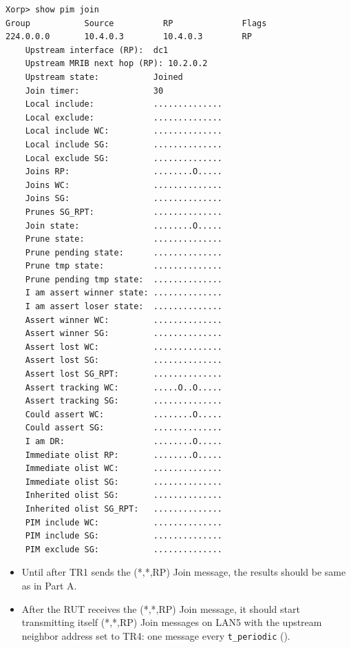 \documentclass[11pt]{report}
\begin{document}
\begin{itemize}
\begin{verbatim}
Xorp> show pim join 
Group           Source          RP              Flags
224.0.0.0       10.4.0.3        10.4.0.3        RP   
    Upstream interface (RP):  dc1
    Upstream MRIB next hop (RP): 10.2.0.2
    Upstream state:           Joined 
    Join timer:               30
    Local include:            ..............
    Local exclude:            ..............
    Local include WC:         ..............
    Local include SG:         ..............
    Local exclude SG:         ..............
    Joins RP:                 ........O.....
    Joins WC:                 ..............
    Joins SG:                 ..............
    Prunes SG_RPT:            ..............
    Join state:               ........O.....
    Prune state:              ..............
    Prune pending state:      ..............
    Prune tmp state:          ..............
    Prune pending tmp state:  ..............
    I am assert winner state: ..............
    I am assert loser state:  ..............
    Assert winner WC:         ..............
    Assert winner SG:         ..............
    Assert lost WC:           ..............
    Assert lost SG:           ..............
    Assert lost SG_RPT:       ..............
    Assert tracking WC:       .....O..O.....
    Assert tracking SG:       ..............
    Could assert WC:          ........O.....
    Could assert SG:          ..............
    I am DR:                  ........O.....
    Immediate olist RP:       ........O.....
    Immediate olist WC:       ..............
    Immediate olist SG:       ..............
    Inherited olist SG:       ..............
    Inherited olist SG_RPT:   ..............
    PIM include WC:           ..............
    PIM include SG:           ..............
    PIM exclude SG:           ..............
\end{verbatim}

\end{itemize}


\begin{itemize}

  \item Until after TR1 sends the (*,*,RP) Join message, the results should be
  same as in Part A.

  \item After the RUT receives the (*,*,RP) Join message, it should start
  transmitting itself (*,*,RP) Join messages on LAN5 with the upstream
  neighbor address set to TR4: one message every \verb=t_periodic=
  ({\PimsmTPeriodic}).

\end{itemize}
\end{document}

